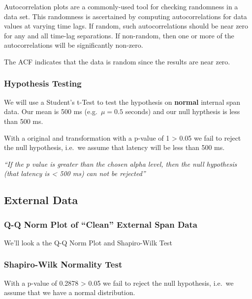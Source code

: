 \documentclass[
  letterpaper,
  DIV=11,
  numbers=noendperiod]{scrartcl}
\begin{document}
Autocorrelation plots are a commonly-used tool for checking randomness
in a data set. This randomness is ascertained by computing
autocorrelations for data values at varying time lags. If random, such
autocorrelations should be near zero for any and all time-lag
separations. If non-random, then one or more of the autocorrelations
will be significantly non-zero.

The ACF indicates that the data is random since the results are near
zero.

\hypertarget{hypothesis-testing}{%
\subsubsection{Hypothesis Testing}\label{hypothesis-testing}}

We will use a Student's t-Test to test the hypothesis on \textbf{normal}
internal span data. Our mean is 500 ms (e.g.~\(\mu = 0.5\) seconds) and
our null hypthesis is less than 500 ms.

With a original and transformation with a p-value of 1 \textgreater{}
0.05 we fail to reject the null hypothesis, i.e.~we assume that latency
will be less than 500 ms.

\emph{``If the p value is greater than the chosen alpha level, then the
null hypothesis (that latency is \textless{} 500 ms) can not be
rejected''}

\hypertarget{external-data}{%
\subsection{External Data}\label{external-data}}

\hypertarget{q-q-norm-plot-of-clean-external-span-data}{%
\subsubsection{Q-Q Norm Plot of ``Clean'' External Span
Data}\label{q-q-norm-plot-of-clean-external-span-data}}

We'll look a the Q-Q Norm Plot and Shapiro-Wilk Test

\hypertarget{shapiro-wilk-normality-test-1}{%
\subsubsection{Shapiro-Wilk Normality
Test}\label{shapiro-wilk-normality-test-1}}

With a p-value of 0.2878 \textgreater{} 0.05 we fail to reject the null
hypothesis, i.e.~we assume that we have a normal distribution.
\end{document}
